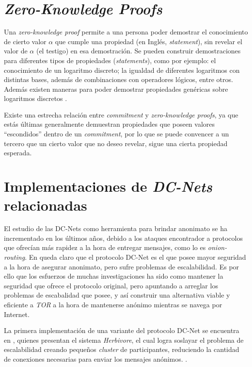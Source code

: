 \section{\emph{Zero-Knowledge Proofs}}

Una \emph{zero-knowledge proof} permite a una persona poder demostrar el conocimiento de cierto valor $\alpha$ que cumple una propiedad 
  (en Inglés, \emph{statement}), sin revelar el valor 
  de $\alpha$ (el testigo) en esa demostración.
Se pueden construir demostraciones para diferentes tipos de propiedades 
  (\emph{statements}), como por ejemplo: el conocimiento de un logaritmo 
  discreto; la igualdad de diferentes logaritmos con distintas bases, además de combinaciones con operadores lógicos, entre otros. 
Además existen maneras para poder demostrar propiedades genéricas sobre
  logaritmos discretos 
  \cite{camenisch1997proof}.
  
Existe una estrecha relación entre \emph{commitment} y \emph{zero-knowledge proofs}, ya que estás últimas generalmente demuestran propiedades que poseen valores ``escondidos'' dentro de un \emph{commitment}, por lo que se puede convencer a un tercero que un cierto valor que no deseo revelar, sigue una cierta propiedad esperada.


\section{Implementaciones de \emph{DC-Nets} relacionadas}

El estudio de las DC-Nets como herramienta para brindar anonimato se ha incrementado en los últimos años, debido a los ataques encontrador a protocolos que ofrecían más rapidez a la hora de entregar mensajes, como lo es \emph{onion-routing}. En \cite{wright2002analysis} queda claro que el protocolo DC-Net es el que posee mayor seguridad a la hora de asegurar anonimato, pero sufre problemas de escalabilidad. Es por ello que los esfuerzos de muchas investigaciones ha sido como mantener la seguridad que ofrece el protocolo original, pero apuntando a arreglar los problemas de escabalidad que posee, y así construir una alternativa viable y eficiente a \emph{TOR} a la hora de mantenerse anónimo mientras se navega por Internet.

La primera implementación de una variante del protocolo DC-Net se encuentra en \cite{goel2003herbivore}, quienes presentan el sistema \emph{Herbivore}, el cual logra soslayar el problema de escalabilidad creando pequeños \emph{cluster} de participantes, reduciendo la cantidad de conexiones necesarias para enviar los mensajes anónimos. .

